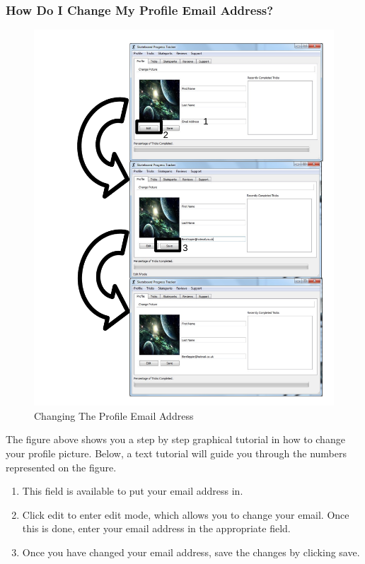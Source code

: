 \subsubsection{How Do I Change My Profile Email Address?}

\begin{figure}[H]
    \includegraphics[width=\textwidth]{./Manual/Images/ChangeEmail.pdf}
    \caption{Changing The Profile Email Address} \label{fig:Change Email}
\end{figure}

The figure above shows you a step by step graphical tutorial in how to change your profile picture. Below, a text tutorial will guide you through the numbers represented on the figure.

\begin{enumerate}
\item This field is available to put your email address in.
\item Click edit to enter edit mode, which allows you to change your email. Once this is done, enter your email address in the appropriate field.
\item Once you have changed your email address, save the changes by clicking save.
\end{enumerate}

